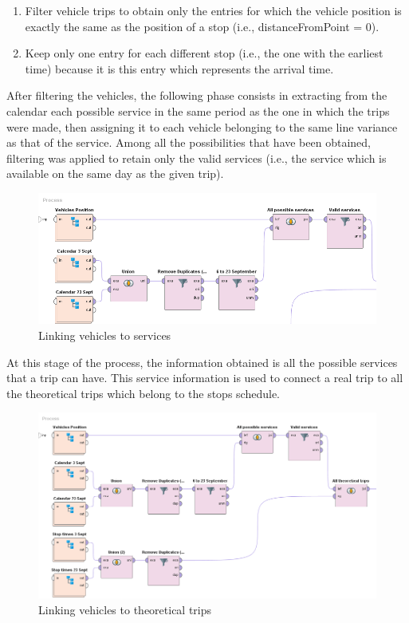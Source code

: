 \documentclass{article}
\begin{document}
\begin{enumerate}
    \item Filter vehicle trips to obtain only the entries for which the vehicle position is exactly the same as the position of a stop (i.e., distanceFromPoint = 0).
    \item Keep only one entry for each different stop (i.e., the one with the earliest time) because it is this entry which represents the arrival time.
\end{enumerate}

 After filtering the vehicles, the following phase consists in extracting from the calendar each possible service in the same period as the one in which the trips were made, then assigning it to each vehicle belonging to the same line variance as that of the service. Among all the possibilities that have been obtained, filtering was applied to retain only the valid services (i.e., the service which is available on the same day as the given trip).
 
 \begin{figure}[H]
    \centering
    \includegraphics[width=\textwidth]{images/First join.png} 
    \caption{Linking vehicles to services}
\end{figure}

At this stage of the process, the information obtained is all the possible services that a trip can have. This service information is used to connect a real trip to all the theoretical trips which belong to the stops schedule.

 \begin{figure}[H]
    \centering
    \includegraphics[width=\textwidth]{images/Second join.png} 
    \caption{Linking vehicles to theoretical trips}
\end{figure}
\end{document}
